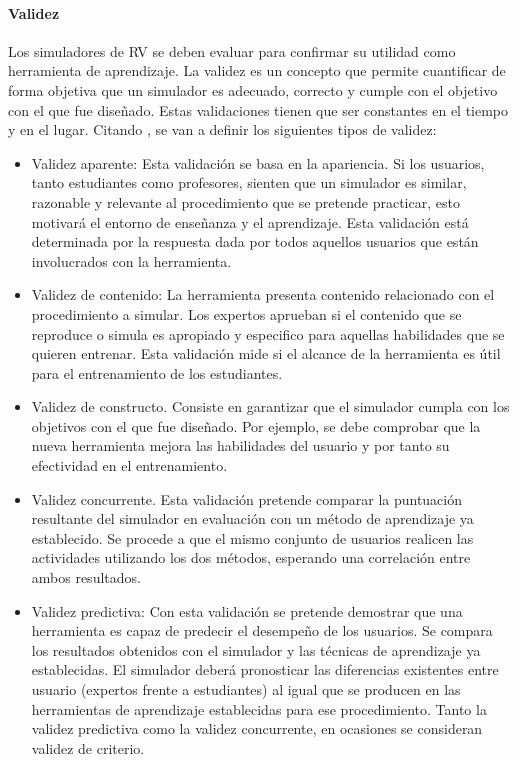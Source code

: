 \paragraph{Validez}

Los simuladores de \ac{RV} se deben evaluar para confirmar su utilidad como herramienta de aprendizaje. La validez es un concepto que permite cuantificar de forma objetiva que un simulador es adecuado, correcto y cumple con el objetivo con el que fue diseñado.
Estas validaciones tienen que ser constantes en el tiempo y en el lugar. Citando \cite{pales2010uso}, se van a definir los siguientes tipos de validez:
\begin{itemize}
    \item Validez aparente:
    Esta validación se basa en la apariencia. Si los usuarios, tanto estudiantes como profesores, sienten que un simulador es similar, razonable y relevante al procedimiento que se pretende practicar, esto motivará el entorno de enseñanza y el aprendizaje. Esta validación está determinada por la respuesta dada por todos aquellos usuarios que están involucrados con la herramienta.
    
    \item Validez de contenido: La herramienta presenta contenido relacionado con el procedimiento a simular. Los expertos aprueban si el contenido que se reproduce o simula%
    es apropiado y especifico para aquellas habilidades que se quieren entrenar.
    Esta validación mide si el alcance de la herramienta es útil para el entrenamiento de los estudiantes.
    
    \item Validez de constructo.
    Consiste en garantizar que el simulador cumpla con los objetivos con el que fue diseñado. Por ejemplo, se debe comprobar que la nueva herramienta mejora las habilidades del usuario y por tanto su efectividad en el entrenamiento. 
    
    \item Validez concurrente.
    Esta validación pretende comparar la puntuación resultante del simulador en evaluación con un método de aprendizaje ya establecido. Se procede a que el mismo conjunto de usuarios realicen las actividades utilizando los dos métodos, esperando una correlación entre ambos resultados.

    \item Validez predictiva:
    Con esta validación se pretende demostrar que una herramienta es capaz de predecir el desempeño de los usuarios. Se compara los resultados obtenidos con el simulador y las técnicas de aprendizaje ya establecidas. El simulador deberá pronosticar las diferencias existentes entre usuario (expertos frente a estudiantes) al igual que se producen en las herramientas de aprendizaje establecidas para ese procedimiento.  Tanto la validez predictiva como la validez concurrente, en ocasiones se consideran validez de criterio. 
    

\end{itemize}
